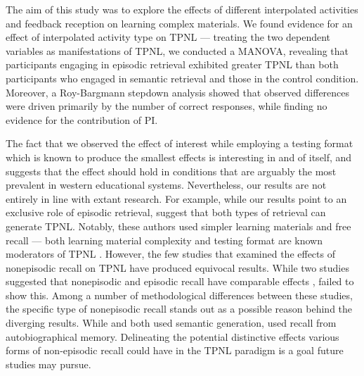 \documentclass[../main.tex]{subfiles}
\begin{document}
The aim of this study was to explore the effects of different interpolated  
activities and feedback reception on learning complex materials. We found 
evidence for an effect of interpolated activity type on TPNL — treating the 
two dependent variables as manifestations of TPNL, we conducted a MANOVA, 
revealing that participants engaging in episodic retrieval exhibited greater 
TPNL than both participants who engaged in semantic retrieval and those in 
the control condition. Moreover, a Roy-Bargmann stepdown analysis showed 
that observed differences were driven primarily by the number of correct 
responses, while finding no evidence for the contribution of PI.

The fact that we observed the effect of interest while employing a testing 
format which is known to produce the smallest effects is interesting in and 
of itself, and suggests that the effect should hold in conditions that are 
arguably the most prevalent in western educational systems. Nevertheless, 
our results are not entirely in line with extant research. For example, 
while our results point to an exclusive role of 
episodic retrieval, \cite{pastotterRetrievalLearningFacilitates2011} suggest 
that both types of retrieval can generate TPNL. Notably, these authors used 
simpler learning materials and free recall — both learning material 
complexity and testing format are known moderators of TPNL 
\citep{chanRetrievalPotentiatesNew2018}. However, the few studies that 
examined the effects of nonepisodic recall on TPNL have produced equivocal 
results. While two studies suggested that nonepisodic and episodic recall 
have comparable effects \citep{divisRetrievalSpeedsContext2014, 
pastotterRetrievalLearningFacilitates2011}, 
\cite{weinsteinNotAllRetrieval2015} failed to show this. Among a number of 
methodological differences between these studies, the specific type of 
nonepisodic recall stands out as a possible reason behind the diverging 
results. While \cite{pastotterRetrievalLearningFacilitates2011} and 
\cite{divisRetrievalSpeedsContext2014} both used semantic generation, 
\cite{weinsteinNotAllRetrieval2015} used recall from autobiographical 
memory. Delineating the potential distinctive effects various forms of 
non-episodic recall could have in the TPNL paradigm is a goal future studies 
may pursue.
\end{document}
